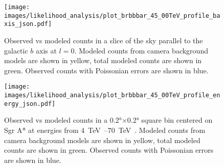   \begin{figure}[t]
    \centering
    \texttt{[image: images/likelihood\_analysis/plot\_brbbbar\_45\_00TeV\_profile\_baxis\_json.pdf]}
    \caption[Galactic Center Profile vs Galactic $b$]{
      Observed vs modeled counts in a slice of the sky parallel to the galactic $b$ axis at $l=0$.
      Modeled counts from camera background models are shown in yellow, total modeled counts are shown in green.
      Observed counts with Poissonian errors are shown in blue.
    }
    \label{fig:gc_profile_gal_b}
  \end{figure}

  
  \begin{figure}[t]
    \centering
    \texttt{[image: images/likelihood\_analysis/plot\_brbbbar\_45\_00TeV\_profile\_energy\_json.pdf]}
    \caption[Galactic Center Profile vs Energy]{
      Observed vs modeled counts in a \ang{0.2}$\times$\ang{0.2} square bin centered on Sgr A* at energies from \SIrange{4}{70}{\TeV{}}.
      Modeled counts from camera background models are shown in yellow, total modeled counts are shown in green.
      Observed counts with Poissonian errors are shown in blue.
      }
    \label{fig:gc_profile_energy}
  \end{figure}
  
